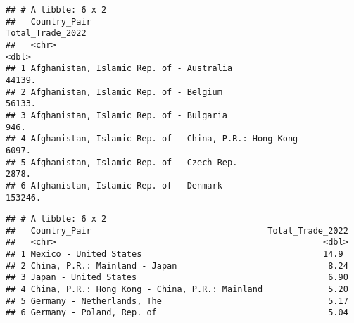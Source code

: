 \documentclass[
]{article}
\newenvironment{Shaded}{\begin{snugshade}}{\end{snugshade}}
\newcommand{\CommentTok}[1]{\textcolor[rgb]{0.56,0.35,0.01}{\textit{#1}}}
\newcommand{\DecValTok}[1]{\textcolor[rgb]{0.00,0.00,0.81}{#1}}
\newcommand{\FunctionTok}[1]{\textcolor[rgb]{0.00,0.00,0.00}{#1}}
\newcommand{\NormalTok}[1]{#1}
\newcommand{\OtherTok}[1]{\textcolor[rgb]{0.56,0.35,0.01}{#1}}
\newcommand{\SpecialCharTok}[1]{\textcolor[rgb]{0.00,0.00,0.00}{#1}}
\begin{document}
\begin{verbatim}
## # A tibble: 6 x 2
##   Country_Pair                                          Total_Trade_2022
##   <chr>                                                            <dbl>
## 1 Afghanistan, Islamic Rep. of - Australia                        44139.
## 2 Afghanistan, Islamic Rep. of - Belgium                          56133.
## 3 Afghanistan, Islamic Rep. of - Bulgaria                           946.
## 4 Afghanistan, Islamic Rep. of - China, P.R.: Hong Kong            6097.
## 5 Afghanistan, Islamic Rep. of - Czech Rep.                        2878.
## 6 Afghanistan, Islamic Rep. of - Denmark                         153246.
\end{verbatim}

\begin{Shaded}
\end{Shaded}

\begin{verbatim}
## # A tibble: 6 x 2
##   Country_Pair                                   Total_Trade_2022
##   <chr>                                                     <dbl>
## 1 Mexico - United States                                    14.9 
## 2 China, P.R.: Mainland - Japan                              8.24
## 3 Japan - United States                                      6.90
## 4 China, P.R.: Hong Kong - China, P.R.: Mainland             5.20
## 5 Germany - Netherlands, The                                 5.17
## 6 Germany - Poland, Rep. of                                  5.04
\end{verbatim}
\end{document}
